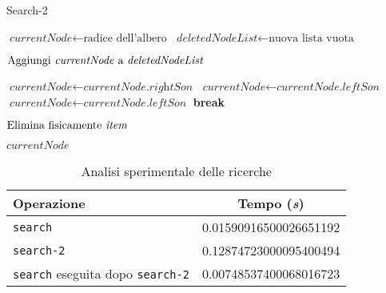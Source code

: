 \documentclass[10pt,a4paper,titlepage]{article}
\begin{document}
\begin{center}
\begin{algorithm}
\caption{Search-2}\label{alg:testd}
\begin{algorithmic}[1]

\State $\textit{currentNode} \gets \text{radice dell'albero}$
\State $\textit{deletedNodeList} \gets \text{nuova lista vuota}$

	\State $\text{Aggiungi \textit{currentNode} a \textit{deletedNodeList}}$
\EndIf

	\State $\textit{currentNode} \gets \textit{currentNode.rightSon}$
	\State $\textit{currentNode} \gets \textit{currentNode.leftSon}$
\Else 
 		\State $\textit{currentNode} \gets \textit{currentNode.leftSon}$
 	\Else 	
 		\State \textbf{break}
 		
\EndIf
\EndIf
\EndWhile


	\State $\text{Elimina fisicamente \textit{item}}$
\EndFor

\State \Return $\textit{currentNode}$

\EndFunction
\end{algorithmic}
\end{algorithm}
\end{center}


\begin{table}
\caption{Analisi sperimentale delle ricerche}\label{table:akko}
\begin{center}
\begin{tabular}{lc}

\toprule
Operazione & Tempo (\textit{s}) \\

\midrule

\texttt{search} & 0.01590916500026651192 \\
\texttt{search-2} & 0.12874723000095400494 \\
\texttt{search} eseguita dopo \texttt{search-2} & 0.00748537400068016723 \\

\bottomrule
\end{tabular}
\end{center}
\end{table}
\end{document}

